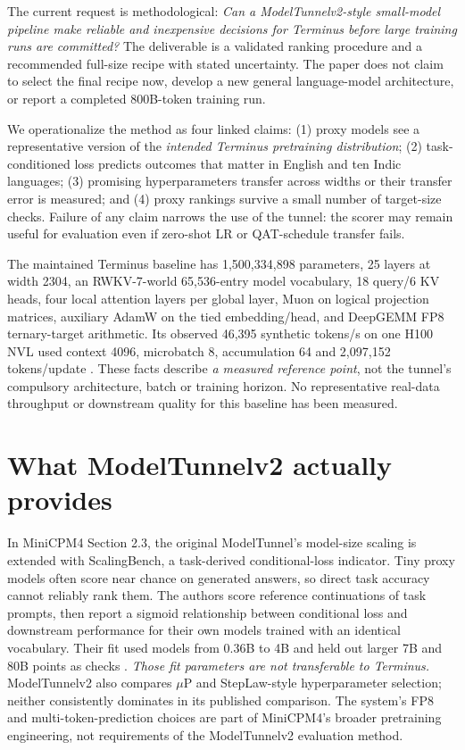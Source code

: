 \documentclass[10pt,a4paper]{article}
\begin{document}
The current request is methodological: \emph{Can a ModelTunnelv2-style small-model pipeline make reliable and inexpensive decisions for Terminus before large training runs are committed?} The deliverable is a validated ranking procedure and a recommended full-size recipe with stated uncertainty. The paper does not claim to select the final recipe now, develop a new general language-model architecture, or report a completed 800B-token training run.

We operationalize the method as four linked claims: (1) proxy models see a representative version of the \emph{intended Terminus pretraining distribution}; (2) task-conditioned loss predicts outcomes that matter in English and ten Indic languages; (3) promising hyperparameters transfer across widths or their transfer error is measured; and (4) proxy rankings survive a small number of target-size checks. Failure of any claim narrows the use of the tunnel: the scorer may remain useful for evaluation even if zero-shot LR or QAT-schedule transfer fails.

The maintained Terminus baseline has 1,500,334,898 parameters, 25 layers at width 2304, an RWKV-7-world 65,536-entry model vocabulary, 18 query/6 KV heads, four local attention layers per global layer, Muon on logical projection matrices, auxiliary AdamW on the tied embedding/head, and DeepGEMM FP8 ternary-target arithmetic. Its observed 46,395 synthetic tokens/s on one H100 NVL used context 4096, microbatch 8, accumulation 64 and 2,097,152 tokens/update \cite{local}. These facts describe \emph{a measured reference point}, not the tunnel's compulsory architecture, batch or training horizon. No representative real-data throughput or downstream quality for this baseline has been measured.

\section{What ModelTunnelv2 actually provides}
\label{sec:source}

In MiniCPM4 Section 2.3, the original ModelTunnel's model-size scaling is extended with ScalingBench, a task-derived conditional-loss indicator. Tiny proxy models often score near chance on generated answers, so direct task accuracy cannot reliably rank them. The authors score reference continuations of task prompts, then report a sigmoid relationship between conditional loss and downstream performance for their own models trained with an identical vocabulary. Their fit used models from 0.36B to 4B and held out larger 7B and 80B points as checks \cite{minicpm4}. \emph{Those fit parameters are not transferable to Terminus.} ModelTunnelv2 also compares $\mu$P and StepLaw-style hyperparameter selection; neither consistently dominates in its published comparison. The system's FP8 and multi-token-prediction choices are part of MiniCPM4's broader pretraining engineering, not requirements of the ModelTunnelv2 evaluation method.
\end{document}

